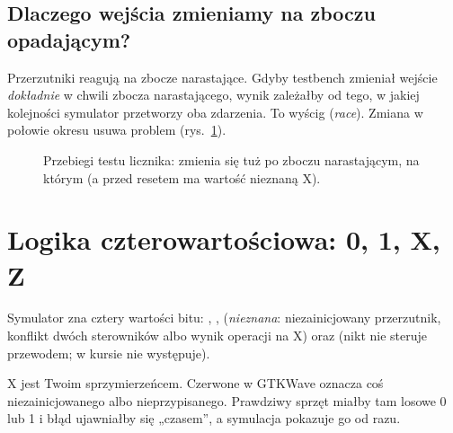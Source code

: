 \subsection*{Dlaczego wejścia zmieniamy na zboczu opadającym?}

Przerzutniki reagują na zbocze narastające. Gdyby testbench zmieniał wejście
\emph{dokładnie} w chwili zbocza narastającego, wynik zależałby od tego, w
jakiej kolejności symulator przetworzy oba zdarzenia. To wyścig
(\emph{race}). Zmiana w połowie okresu usuwa problem (rys.~\ref{fig:cnt}).

\begin{figure}[h]
\centering
{}
\caption{Przebiegi testu licznika:  zmienia się tuż po zboczu narastającym,
na którym  (a przed resetem ma wartość nieznaną X).}
\label{fig:cnt}
\end{figure}

\section{Logika czterowartościowa: 0, 1, X, Z}

Symulator zna cztery wartości bitu: , , 
(\emph{nieznana}: niezainicjowany przerzutnik, konflikt dwóch sterowników
albo wynik operacji na X) oraz  (nikt nie steruje przewodem; w kursie
nie występuje).

X jest Twoim sprzymierzeńcem. Czerwone  w GTKWave oznacza coś
niezainicjowanego albo nieprzypisanego. Prawdziwy sprzęt miałby tam losowe 0
lub 1 i błąd ujawniałby się „czasem”, a symulacja pokazuje go od razu.

